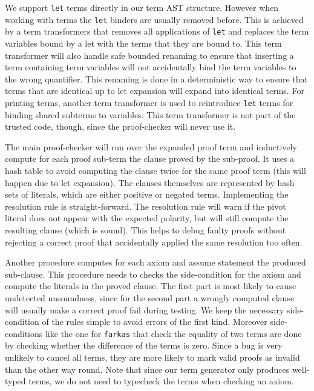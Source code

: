 \documentclass[a4paper]{easychair}
\newcommand\smtlib[1]{\texttt{#1}}
\begin{document}
We support \smtlib{let} terms directly in our term AST structure.
However when working with terms the \smtlib{let} binders are usually removed before.
This is achieved by a term transformers that removes all applications of \smtlib{let} and replaces the term variables bound by a let with the terms that they are bound to.
This term transformer will also handle safe bounded renaming to ensure that inserting a term containing term variables will not accidentally bind the term variables to the wrong quantifier.
This renaming is done in a deterministic way to ensure that terms that are identical up to let expansion will expand into identical terms.
For printing terms, another term transformer is used to reintroduce \smtlib{let} terms for binding shared subterms to variables.
This term transformer is not part of the trusted code, though, since the proof-checker will never use it.

The main proof-checker will run over the expanded proof term and inductively compute for each proof sub-term the clause proved by the sub-proof.
It uses a hash table to avoid computing the clause twice for the same proof term (this will happen due to let expansion).
The clauses themselves are represented by hash sets of literals, which are either positive or negated terms.
Implementing the resolution rule is straight-forward.
The resolution rule will warn if the pivot literal does not appear with the expected polarity, but will still compute the resulting clause (which is sound).
This helps to debug faulty proofs without rejecting a correct proof that accidentally applied the same resolution too often.

Another procedure computes for each axiom and assume statement the produced sub-clause.
This procedure needs to checks the side-condition for the axiom and compute the literals in the proved clause.
The first part is most likely to cause undetected unsoundness, since for the second part a wrongly computed clause will usually make a correct proof fail during testing.
We keep the necessary side-condition of the rules simple to avoid errors of the first kind.
Moreover side-conditions like the one for \smtlib{farkas} that check the equality of two terms are done by checking whether the difference of the terms is zero.
Since a bug is very unlikely to cancel all terms, they are more likely to mark valid proofs as invalid than the other way round.
Note that since our term generator only produces well-typed terms, we do not need to typecheck the terms when checking an axiom.
\end{document}
